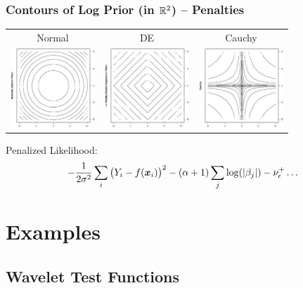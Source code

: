 \documentclass[dvips]{beamer}
\newcommand{\bs}[2]{\begin{frame} \frametitle{#1} 
{#2}
\end{frame} }
\begin{document}
\bs{Contours of Log Prior (in $\mathbb{R}^2$) -- Penalties} {
\begin{tabular}{ccc}
Normal  & DE  & Cauchy \\
\includegraphics[angle=270,width=1.25in,clip=1]{../eps/L2.ps} &
\includegraphics[angle=270,width=1.25in,clip=1]{../eps/L1.ps} &
\includegraphics[angle=270,width=1.25in,clip=1]{../eps/cauchy.ps}
\end{tabular}
 
\vspace{.25in}
Penalized Likelihood:
$$-\frac{1}{2 \sigma^2} \sum_i\big(Y_i - f(\bm x_i)\big)^2  - (\alpha +
1) \sum_j
\log(|\beta_j|)  - \nu^+_{\epsilon} \ldots $$
}



\section{Examples}

\subsection{Wavelet Test Functions}
\end{document}
